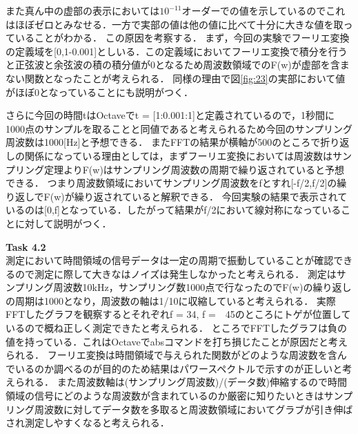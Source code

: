 \documentclass[11pt, a4paper,twocolumn]{jarticle}
\begin{document}
また真ん中の虚部の表示においては$10^{-11}$オーダーでの値を示しているのでこれはほぼゼロとみなせる．一方で実部の値は他の値に比べて十分に大きな値を取っていることがわかる．
この原因を考察する．
まず，今回の実験でフーリエ変換の定義域を[0,1-0.001]としいる．この定義域においてフーリエ変換で積分を行うと正弦波と余弦波の積の積分値が0となるため周波数領域でのF(w)が虚部を含まない関数となったことが考えられる．
同様の理由で図\ref{fig:23}の実部において値がほぼ0となっていることにも説明がつく．

さらに今回の時間tはOctaveでt = [1:0.001:1]と定義されているので，1秒間に1000点のサンプルを取ることと同値であると考えられるため今回のサンプリング周波数は1000[Hz]と予想できる．
またFFTの結果が横軸が500のところで折り返しの関係になっている理由としては，まずフーリエ変換においては周波数はサンプリング定理よりF(w)はサンプリング周波数の周期で繰り返されていると予想できる．
つまり周波数領域においてサンプリング周波数をfとすれ[-f/2,f/2]の繰り返しでF(w)が繰り返されていると解釈できる．
今回実験の結果で表示されているのは[0,f]となっている．したがって結果がf/2において線対称になっていることに対して説明がつく．

\noindent
\textbf{Task 4.2} \\
測定において時間領域の信号データは一定の周期で振動していることが確認できるので測定に際して大きなはノイズは発生しなかったと考えられる．
測定はサンプリング周波数10kHz，サンプリング数1000点で行なったのでF(w)の繰り返しの周期は1000となり，周波数の軸は1/10に収縮していると考えられる．
実際FFTしたグラフを観察するとそれぞれf = 34, f =　45のところにトゲが位置しているので概ね正しく測定できたと考えられる．
ところでFFTしたグラフは負の値を持っている．これはOctaveでabsコマンドを打ち損じたことが原因だと考えられる．
フーリエ変換は時間領域で与えられた関数がどのような周波数を含んでいるのか調べるのが目的のため結果はパワースペクトルで示すのが正しいと考えられる．
また周波数軸は(サンプリング周波数)/(データ数)伸縮するので時間領域の信号にどのような周波数が含まれているのか厳密に知りたいときはサンプリング周波数に対してデータ数を多取ると周波数領域においてグラブが引き伸ばされ測定しやすくなると考えられる．



\newpage
\end{document}
